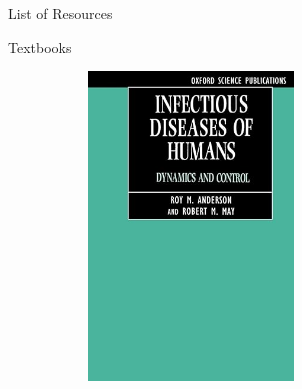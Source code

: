 \documentclass[
  ignorenonframetext,
]{beamer}
\begin{document}
\begin{frame}{List of Resources}
\label{list-of-resources}
\begin{block}{Textbooks}
\label{textbooks}
\begin{figure}

\begin{minipage}{0.50\linewidth}

\begin{figure}[H]

{\centering \includegraphics[width=0.6\textwidth,height=\textheight]{images/Anderson_and_May.jpeg}

}


\end{figure}%

\end{minipage}%
%
\begin{minipage}{0.50\linewidth}

\begin{figure}[H]


\end{figure}
\end{minipage}
\end{figure}
\end{block}
\end{frame}
\end{document}
